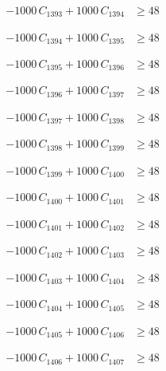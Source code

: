 \documentclass[a4paper,11pt]{article}
\begin{document}
\begin{align}
-1000\,C_{1393} + 1000\,C_{1394} &\geq 48 \nonumber
\end{align}

\begin{align}
-1000\,C_{1394} + 1000\,C_{1395} &\geq 48 \nonumber
\end{align}

\begin{align}
-1000\,C_{1395} + 1000\,C_{1396} &\geq 48 \nonumber
\end{align}

\begin{align}
-1000\,C_{1396} + 1000\,C_{1397} &\geq 48 \nonumber
\end{align}

\begin{align}
-1000\,C_{1397} + 1000\,C_{1398} &\geq 48 \nonumber
\end{align}

\begin{align}
-1000\,C_{1398} + 1000\,C_{1399} &\geq 48 \nonumber
\end{align}

\begin{align}
-1000\,C_{1399} + 1000\,C_{1400} &\geq 48 \nonumber
\end{align}

\begin{align}
-1000\,C_{1400} + 1000\,C_{1401} &\geq 48 \nonumber
\end{align}

\begin{align}
-1000\,C_{1401} + 1000\,C_{1402} &\geq 48 \nonumber
\end{align}

\begin{align}
-1000\,C_{1402} + 1000\,C_{1403} &\geq 48 \nonumber
\end{align}

\begin{align}
-1000\,C_{1403} + 1000\,C_{1404} &\geq 48 \nonumber
\end{align}

\begin{align}
-1000\,C_{1404} + 1000\,C_{1405} &\geq 48 \nonumber
\end{align}

\begin{align}
-1000\,C_{1405} + 1000\,C_{1406} &\geq 48 \nonumber
\end{align}

\begin{align}
-1000\,C_{1406} + 1000\,C_{1407} &\geq 48 \nonumber
\end{align}
\end{document}

